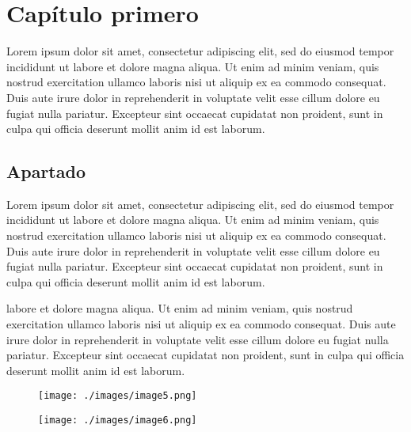 \chapter{Capítulo primero}\label{cap:cap1}
Lorem ipsum dolor sit amet, consectetur adipiscing elit, sed do eiusmod tempor incididunt ut labore et dolore magna aliqua. Ut enim ad minim veniam, quis nostrud exercitation ullamco laboris nisi ut aliquip ex ea commodo consequat. Duis aute irure dolor in reprehenderit in voluptate velit esse cillum dolore eu fugiat nulla pariatur. Excepteur sint occaecat cupidatat non proident, sunt in culpa qui officia deserunt mollit anim id est laborum.

\section{Apartado}\label{sec:apartado}
Lorem ipsum dolor sit amet, consectetur adipiscing elit, sed do eiusmod tempor incididunt ut labore et dolore magna aliqua. Ut enim ad minim veniam, quis nostrud exercitation ullamco laboris nisi ut aliquip ex ea commodo consequat. Duis aute irure dolor in reprehenderit in voluptate velit esse cillum dolore eu fugiat nulla pariatur. Excepteur sint occaecat cupidatat non proident, sunt in culpa qui officia deserunt mollit anim id est laborum.

\begin{center}
{\textbf{}}
\end{center}

labore et dolore magna aliqua. Ut enim ad minim veniam, quis nostrud exercitation ullamco laboris nisi ut aliquip ex ea commodo consequat. Duis aute irure dolor in reprehenderit in voluptate velit esse cillum dolore eu fugiat nulla pariatur. Excepteur sint occaecat cupidatat non proident, sunt in culpa qui officia deserunt mollit anim id est laborum.

\begin{figure}[ht]
    \begin{center}
        \texttt{[image: ./images/image5.png]}
        \caption{}
        \label{fig:fig1}
    \end{center}
\end{figure}

\begin{figure}[ht]
    \begin{center}
        \texttt{[image: ./images/image6.png]}
        \caption{}
        \label{fig:fig2}
    \end{center}
\end{figure}

